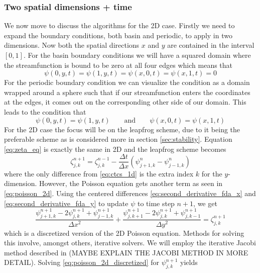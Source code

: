 \documentclass[12pt]{article}
\numberwithin{figure}{section}
\numberwithin{table}{section}
\begin{document}
\subsubsection{Two spatial dimensions + time}
We now move to discuss the algorithms for the 2D case. Firstly we need to expand the boundary conditions, both basin and periodic, to apply in two dimensions. Now both the spatial directions $x$ and $y$ are contained in the interval $[0,1]$. For the basin boundary conditions we will have a squared domain where the streamfunction is bound to be zero at all four edges which means that
\begin{equation}
	\psi(0,y,t)=\psi(1,y,t)=\psi(x,0,t)=\psi(x,1,t)=0 \label{eq:dirichlet_bc_2d}
\end{equation}
For the periodic boundary condition we can visualize the condition as a domain wrapped around a sphere such that if our streamfunction enters the coordinates at the edges, it comes out on the corresponding other side of our domain. This leads to the condition that
\begin{equation}
	\psi(0,y,t)=\psi(1,y,t) \qquad\text{and}\qquad \psi(x,0,t)=\psi(x,1,t) \label{eq:periodic_bc_2d}
\end{equation}
For the 2D case the focus will be on the leapfrog scheme, due to it being the preferable scheme as is considered more in section \ref{sec:stability}. Equation \eqref{eq:zeta_eq} is exactly the same in 2D and the leapfrog scheme becomes
\begin{equation}
	\zeta_{j,k}^{n+1}=\zeta_{j,k}^{n-1}-\frac{\Delta t}{\Delta x}(\psi_{j+1,k}^n-\psi_{j-1,k}^n) \label{eq:ctcs_2d}
\end{equation}
where the only difference from \eqref{eq:ctcs_1d} is the extra index $k$ for the $y$-dimension. However, the Poisson equation gets another term as seen in \eqref{eq:poisson_2d}. Using the centered differences \eqref{eq:second_derivative_fda_x} and \eqref{eq:second_derivative_fda_y} to update $\psi$ to time step $n+1$, we get
\begin{equation}
	\frac{\psi_{j+1,k}^{n+1}-2\psi_{j,k}^{n+1}+\psi_{j-1,k}^{n+1}}{\Delta x^2}+\frac{\psi_{j,k+1}^{n+1}-2\psi_{j,k}^{n+1}+\psi_{j,k-1}^{n+1}}{\Delta y^2}=\zeta_{j,k}^{n+1} \label{eq:poisson_2d_discretized}
\end{equation}
which is a discretized version of the 2D Poisson equation. Methods for solving this involve, amongst others, iterative solvers. We will employ the iterative Jacobi method described in \cite{Comp} (MAYBE EXPLAIN THE JACOBI METHOD IN MORE DETAIL). Solving \eqref{eq:poisson_2d_discretized} for $\psi_{j,k}^{n+1}$ yields
\end{document}
